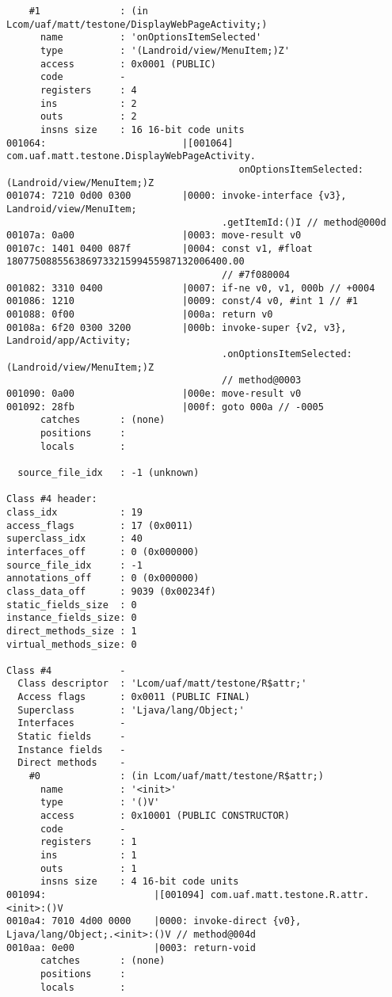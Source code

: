 \begin{lstlisting}
    #1              : (in Lcom/uaf/matt/testone/DisplayWebPageActivity;)
      name          : 'onOptionsItemSelected'
      type          : '(Landroid/view/MenuItem;)Z'
      access        : 0x0001 (PUBLIC)
      code          -
      registers     : 4
      ins           : 2
      outs          : 2
      insns size    : 16 16-bit code units
001064:                        |[001064] com.uaf.matt.testone.DisplayWebPageActivity.
                                         onOptionsItemSelected:(Landroid/view/MenuItem;)Z
001074: 7210 0d00 0300         |0000: invoke-interface {v3}, Landroid/view/MenuItem;
                                      .getItemId:()I // method@000d
00107a: 0a00                   |0003: move-result v0
00107c: 1401 0400 087f         |0004: const v1, #float 180775088556386973321599455987132006400.00
                                      // #7f080004
001082: 3310 0400              |0007: if-ne v0, v1, 000b // +0004
001086: 1210                   |0009: const/4 v0, #int 1 // #1
001088: 0f00                   |000a: return v0
00108a: 6f20 0300 3200         |000b: invoke-super {v2, v3}, Landroid/app/Activity;
                                      .onOptionsItemSelected:(Landroid/view/MenuItem;)Z
                                      // method@0003
001090: 0a00                   |000e: move-result v0
001092: 28fb                   |000f: goto 000a // -0005
      catches       : (none)
      positions     :
      locals        :

  source_file_idx   : -1 (unknown)

Class #4 header:
class_idx           : 19
access_flags        : 17 (0x0011)
superclass_idx      : 40
interfaces_off      : 0 (0x000000)
source_file_idx     : -1
annotations_off     : 0 (0x000000)
class_data_off      : 9039 (0x00234f)
static_fields_size  : 0
instance_fields_size: 0
direct_methods_size : 1
virtual_methods_size: 0

Class #4            -
  Class descriptor  : 'Lcom/uaf/matt/testone/R$attr;'
  Access flags      : 0x0011 (PUBLIC FINAL)
  Superclass        : 'Ljava/lang/Object;'
  Interfaces        -
  Static fields     -
  Instance fields   -
  Direct methods    -
    #0              : (in Lcom/uaf/matt/testone/R$attr;)
      name          : '<init>'
      type          : '()V'
      access        : 0x10001 (PUBLIC CONSTRUCTOR)
      code          -
      registers     : 1
      ins           : 1
      outs          : 1
      insns size    : 4 16-bit code units
001094:                   |[001094] com.uaf.matt.testone.R.attr.<init>:()V
0010a4: 7010 4d00 0000    |0000: invoke-direct {v0}, Ljava/lang/Object;.<init>:()V // method@004d
0010aa: 0e00              |0003: return-void
      catches       : (none)
      positions     :
      locals        :


\end{lstlisting}
